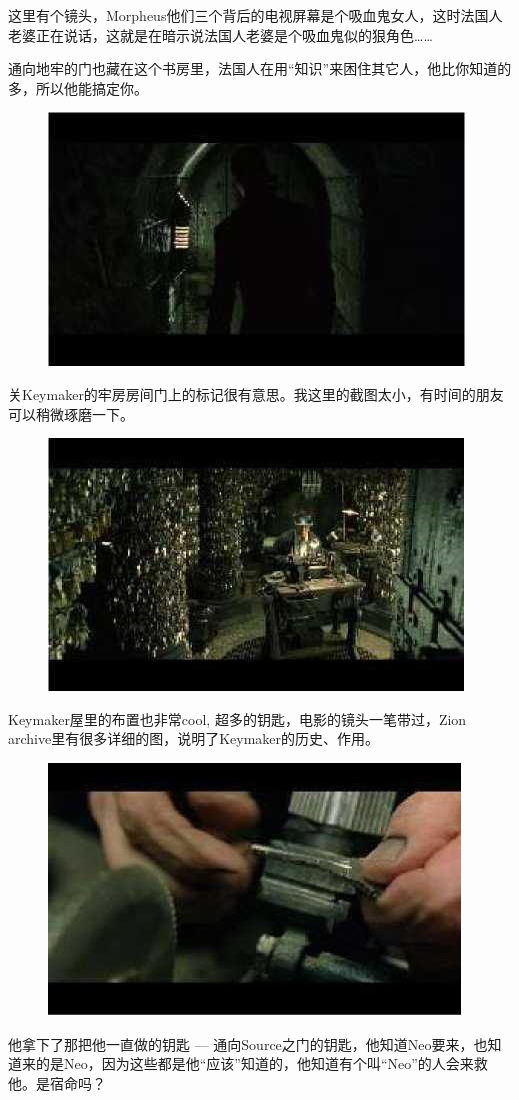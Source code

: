 \documentclass{ctexart}
\begin{document}
这里有个镜头，Morpheus他们三个背后的电视屏幕是个吸血鬼女人，这时法国人老婆正在说话，这就是在暗示说法国人老婆是个吸血鬼似的狠角色……

通向地牢的门也藏在这个书房里，法国人在用“知识”来困住其它人，他比你知道的多，所以他能搞定你。

\begin{figure}[htb]
\centering
\includegraphics[width=0.5\linewidth]{fig/read_reloaded-114}
\end{figure}

关Keymaker的牢房房间门上的标记很有意思。我这里的截图太小，有时间的朋友可以稍微琢磨一下。

\begin{figure}[htb]
\centering
\includegraphics[width=0.5\linewidth]{fig/read_reloaded-115}
\end{figure}

Keymaker屋里的布置也非常cool, 超多的钥匙，电影的镜头一笔带过，Zion archive里有很多详细的图，说明了Keymaker的历史、作用。

\begin{figure}[htb]
\centering
\includegraphics[width=0.5\linewidth]{fig/read_reloaded-115-1}
\end{figure}

他拿下了那把他一直做的钥匙 --- 通向Source之门的钥匙，他知道Neo要来，也知道来的是Neo，因为这些都是他“应该”知道的，他知道有个叫“Neo”的人会来救他。是宿命吗？
\end{document}
